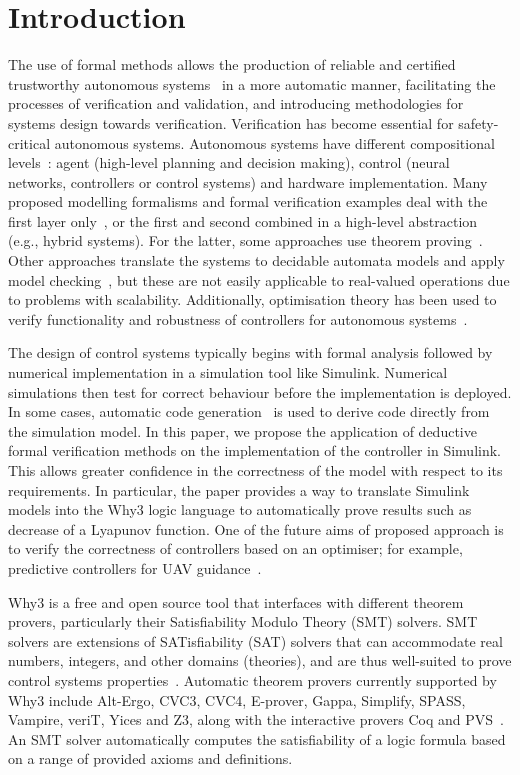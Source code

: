 \documentclass[a4paper]{article}
\begin{document}
\section{Introduction}
The use of formal methods allows the production of reliable and certified trustworthy autonomous systems~\cite{Simmons,Fisher} in a more automatic manner, facilitating the processes of verification and validation, and introducing methodologies for systems design towards verification. Verification has become essential for safety-critical autonomous systems. Autonomous systems have different compositional levels~\cite{Fisher}: agent (high-level planning and decision making), control (neural networks, controllers or control systems) and hardware implementation. Many proposed modelling formalisms and formal verification examples deal with the first layer only~\cite{Dixon,Webster,Siri}, or the first and second combined in a high-level abstraction (e.g., hybrid systems). For the latter, some approaches use theorem proving~\cite{Keymaeraa}. Other approaches translate the systems to decidable automata models and apply model checking~\cite{mc2002,MC2011,faults}, but these are not easily applicable to real-valued operations due to problems with scalability. Additionally, optimisation theory has been used to verify functionality and robustness of controllers for autonomous systems~\cite{Wang,Henrion}. 

The design of control systems typically begins with formal analysis followed by numerical implementation in a simulation tool like Simulink.  Numerical simulations then test for correct behaviour before the implementation is deployed.  In some cases, automatic code generation~\cite{Geneauto} is used to derive code directly from the simulation model.  In this paper, we propose the application of deductive formal verification methods on the implementation of the controller in Simulink.  This allows greater confidence in the correctness of the model with respect to its requirements.  In particular, the paper provides a way to translate Simulink models into the Why3 logic language to automatically prove results such as decrease of a Lyapunov function. One of the future aims of proposed approach is to verify the correctness of controllers based on an optimiser; for example, predictive controllers for UAV guidance~\cite{Arthur1,Arthur2}.

Why3 is a free and open source tool that interfaces with different theorem provers, particularly their Satisfiability Modulo Theory (SMT) solvers.  SMT solvers are extensions of SATisfiability (SAT) solvers that can accommodate real numbers, integers, and other domains (theories), and are thus well-suited to prove control systems properties~\cite{Metitarski}. Automatic theorem provers currently supported by Why3 include Alt-Ergo, CVC3, CVC4, E-prover, Gappa, Simplify, SPASS, Vampire, veriT, Yices and Z3, along with the interactive provers Coq and PVS~\cite{Why3b}. An SMT solver automatically computes the satisfiability of a logic formula based on a range of provided axioms and definitions.
\end{document}
